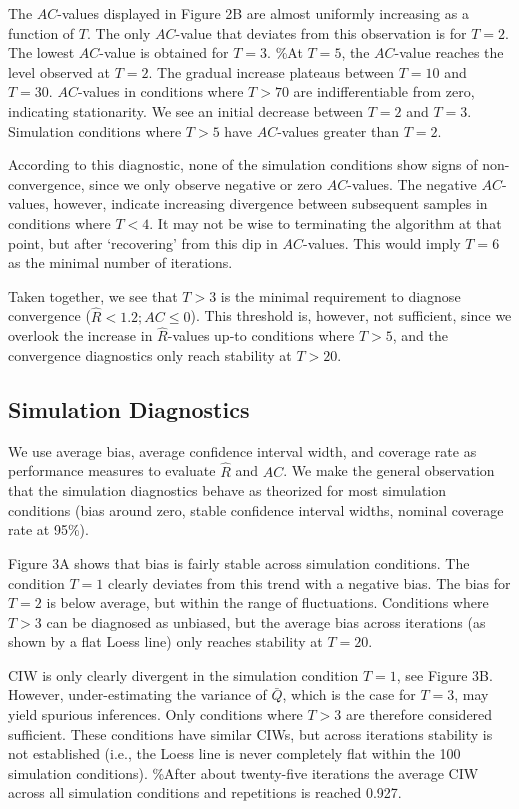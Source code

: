 \documentclass[Royal,times,sageh]{sagej}
\begin{document}
The \(AC\)-values displayed in Figure 2B are almost uniformly increasing
as a function of \(T\). The only \(AC\)-value that deviates from this
observation is for \(T=2\). The lowest \(AC\)-value is obtained for
\(T=3\). \%At \(T=5\), the \(AC\)-value reaches the level observed at
\(T=2\). The gradual increase plateaus between \(T=10\) and \(T=30\).
\(AC\)-values in conditions where \(T>70\) are indifferentiable from
zero, indicating stationarity. We see an initial decrease between
\(T=2\) and \(T=3\). Simulation conditions where \(T>5\) have
\(AC\)-values greater than \(T=2\).

According to this diagnostic, none of the simulation conditions show
signs of non-convergence, since we only observe negative or zero
\(AC\)-values. The negative \(AC\)-values, however, indicate increasing
divergence between subsequent samples in conditions where \(T<4\). It
may not be wise to terminating the algorithm at that point, but after
`recovering' from this dip in \(AC\)-values. This would imply \(T=6\) as
the minimal number of iterations.

Taken together, we see that \(T>3\) is the minimal requirement to
diagnose convergence (\(\widehat{R} < 1.2; AC \leq 0\)). This threshold
is, however, not sufficient, since we overlook the increase in
\(\widehat{R}\)-values up-to conditions where \(T>5\), and the
convergence diagnostics only reach stability at \(T>20\).

\hypertarget{simulation-diagnostics}{%
\subsection{Simulation Diagnostics}\label{simulation-diagnostics}}

We use average bias, average confidence interval width, and coverage
rate as performance measures to evaluate \(\widehat{R}\) and \(AC\). We
make the general observation that the simulation diagnostics behave as
theorized for most simulation conditions (bias around zero, stable
confidence interval widths, nominal coverage rate at 95\%).

Figure 3A shows that bias is fairly stable across simulation conditions.
The condition \(T=1\) clearly deviates from this trend with a negative
bias. The bias for \(T=2\) is below average, but within the range of
fluctuations. Conditions where \(T>3\) can be diagnosed as unbiased, but
the average bias across iterations (as shown by a flat Loess line) only
reaches stability at \(T=20\).

CIW is only clearly divergent in the simulation condition \(T=1\), see
Figure 3B. However, under-estimating the variance of \(\bar{Q}\), which
is the case for \(T=3\), may yield spurious inferences. Only conditions
where \(T>3\) are therefore considered sufficient. These conditions have
similar CIWs, but across iterations stability is not established (i.e.,
the Loess line is never completely flat within the 100 simulation
conditions). \%After about twenty-five iterations the average CIW across
all simulation conditions and repetitions is reached 0.927.
\end{document}
